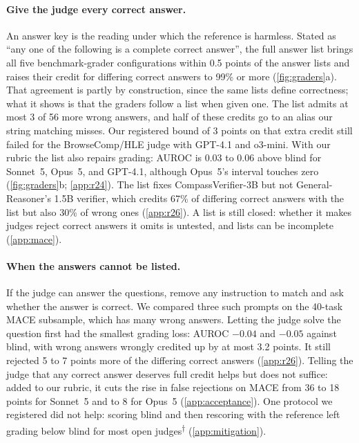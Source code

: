 \documentclass{article}
\newcommand{\ph}{\textsuperscript{$\dagger$}}
\begin{document}
\paragraph{Give the judge every correct answer.}
An answer key is the reading under which the reference is harmless.
Stated as ``any one of the following is a complete correct answer'', the full answer list brings all five benchmark-grader configurations within 0.5 points of the answer lists and raises their credit for differing correct answers to 99\% or more (\cref{fig:graders}a).
That agreement is partly by construction, since the same lists define correctness; what it shows is that the graders follow a list when given one. The list admits at most 3 of 56 more wrong answers, and half of these credits go to an alias our string matching misses.
Our registered bound of 3 points on that extra credit still failed for the BrowseComp/HLE judge with GPT-4.1 and o3-mini.
With our rubric the list also repairs grading: AUROC is 0.03 to 0.06 above blind for Sonnet~5, Opus~5, and GPT-4.1, although Opus~5's interval touches zero (\cref{fig:graders}b; \cref{app:r24}).
The list fixes CompassVerifier-3B but not General-Reasoner's 1.5B verifier, which credits 67\% of differing correct answers with the list but also 30\% of wrong ones (\cref{app:r26}).
A list is still closed: whether it makes judges reject correct answers it omits is untested, and lists can be incomplete (\cref{app:mace}).

\paragraph{When the answers cannot be listed.}
If the judge can answer the questions, remove any instruction to match and ask whether the answer is correct.
We compared three such prompts on the 40-task \textsc{MACE} subsample, which has many wrong answers.
Letting the judge solve the question first had the smallest grading loss: AUROC $-0.04$ and $-0.05$ against blind, with wrong answers wrongly credited up by at most 3.2 points.
It still rejected 5 to 7 points more of the differing correct answers (\cref{app:r26}).
Telling the judge that any correct answer deserves full credit helps but does not suffice: added to our rubric, it cuts the rise in false rejections on \textsc{MACE} from 36 to 18 points for Sonnet~5 and to 8 for Opus~5 (\cref{app:acceptance}).
One protocol we registered did not help: scoring blind and then rescoring with the reference left grading below blind for most open judges\ph{} (\cref{app:mitigation}).
\end{document}
